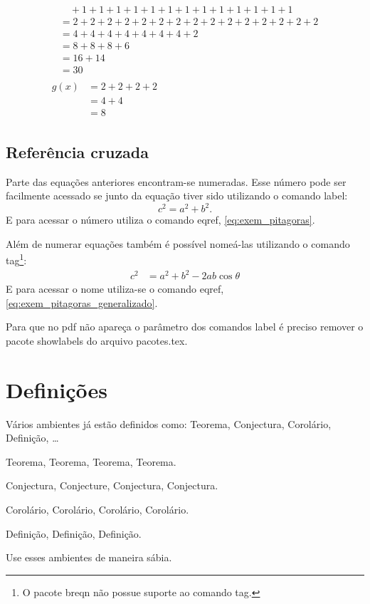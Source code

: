 \begin{description}
\begin{align}
\begin{split}
        &\quad {}+ 1 + 1 + 1 + 1 + 1 + 1 + 1 + 1 + 1 + 1 + 1 + 1 + 1 \\
        &= 2 + 2 + 2 + 2 + 2 + 2 + 2 + 2 + 2 + 2 + 2 + 2 + 2 + 2 + 2 \\
        &= 4 + 4 + 4 + 4 + 4 + 4 + 4 + 2 \\
        &= 8 + 8 + 8 + 6 \\
        &= 16 + 14 \\
        &= 30
      \end{split} \\
      \begin{split}
        g(x) &= 2 + 2 + 2 + 2 \\
        &= 4 + 4 \\
        &= 8
      \end{split}
    \end{align}
\end{description}

\subsection{Referência cruzada}
Parte das equações anteriores encontram-se numeradas. Esse número pode ser
facilmente acessado se junto da equação tiver sido utilizando o comando label:
\begin{dmath}
  c^2 = a^2 + b^2. \label{eq:exem_pitagoras}
\end{dmath}
E para acessar o número utiliza o comando eqref, \eqref{eq:exem_pitagoras}.

Além de numerar equações também é possível nomeá-las utilizando o comando
tag\footnote{O pacote breqn não possue suporte ao comando tag.}:
\begin{align}
  c^2 &= a^2 + b^2 - 2 a b \cos\theta 
  \label{eq:exem_pitagoras_generalizado}
  \tag{GTP}
\end{align}
E para acessar o nome utiliza-se o comando eqref,
\eqref{eq:exem_pitagoras_generalizado}.

Para que no pdf não apareça o parâmetro dos comandos label é preciso remover o
pacote showlabels do arquivo pacotes.tex.

\section{Definições}

Vários ambientes já estão definidos como: Teorema, Conjectura, Corolário,
Definição, \ldots

\begin{thm}
Teorema, Teorema, Teorema, Teorema.
\end{thm}

\begin{con}
Conjectura, Conjecture, Conjectura, Conjectura.
\end{con}

\begin{cor}
Corolário, Corolário, Corolário, Corolário.
\end{cor}

\begin{dfn}
Definição, Definição, Definição.
\end{dfn}

Use esses ambientes de maneira sábia.

